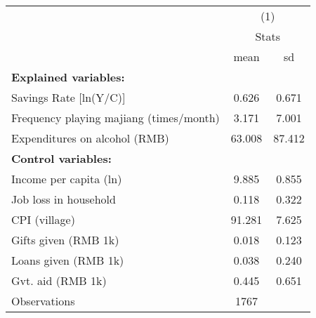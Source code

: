 {
\def\sym#1{\ifmmode^{#1}\else\(^{#1}\)\fi}
\begin{tabular}{l*{1}{cc}}
\hline\hline
                    &\multicolumn{2}{c}{(1)}  \\
                    &\multicolumn{2}{c}{Stats}\\
                    &        mean&          sd\\
\hline
\textbf{Explained variables:}&            &            \\
Savings Rate [ln(Y/C)]&       0.626&       0.671\\
Frequency playing majiang (times/month)&       3.171&       7.001\\
Expenditures on alcohol (RMB)&      63.008&      87.412\\
\textbf{Control variables:}&            &            \\
Income per capita (ln)&       9.885&       0.855\\
Job loss in household&       0.118&       0.322\\
CPI (village)       &      91.281&       7.625\\
Gifts given (RMB 1k)&       0.018&       0.123\\
Loans given (RMB 1k)&       0.038&       0.240\\
Gvt. aid (RMB 1k)   &       0.445&       0.651\\
\hline
Observations        &        1767&            \\
\hline\hline
\end{tabular}
}

